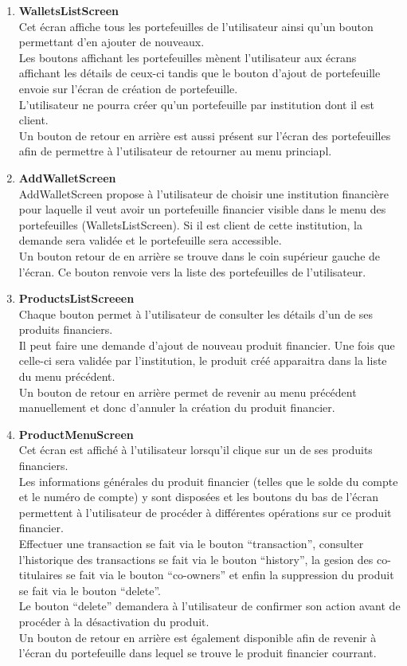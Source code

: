 \documentclass{article}
\begin{document}
\begin{enumerate}
\item \textbf{WalletsListScreen} \\
Cet écran affiche tous les portefeuilles de l'utilisateur ainsi qu'un bouton permettant d'en ajouter de nouveaux.\\
Les boutons affichant les portefeuilles mènent l'utilisateur aux écrans affichant les détails de ceux-ci tandis que le bouton d'ajout de portefeuille envoie sur l'écran de création de portefeuille.\\
L'utilisateur ne pourra créer qu'un portefeuille par institution dont il est client.\\
Un bouton de retour en arrière est aussi présent sur l'écran des portefeuilles afin de permettre à l'utilisateur de retourner au menu princiapl.

\item \textbf{AddWalletScreen} \\
AddWalletScreen propose à l'utilisateur de choisir une institution financière pour laquelle il veut avoir un portefeuille financier visible dans le menu des portefeuilles (WalletsListScreen). Si il est client de cette institution, la demande sera validée et le portefeuille sera accessible.\\
Un bouton retour de en arrière se trouve dans le coin supérieur gauche de l'écran. Ce bouton renvoie vers la liste des portefeuilles de l'utilisateur.

\item \textbf{ProductsListScreeen} \\
Chaque bouton permet à l'utilisateur de consulter les détails d'un de ses produits financiers.\\
Il peut faire une demande d'ajout de nouveau produit financier. Une fois que celle-ci sera validée par l'institution, le produit créé apparaitra dans la liste du menu précédent.\\
Un bouton de retour en arrière permet de revenir au menu précédent manuellement et donc d'annuler la création du produit financier.

\item \textbf{ProductMenuScreen}\\
Cet écran est affiché à l'utilisateur lorsqu'il clique sur un de ses produits financiers. \\
Les informations générales du produit financier (telles que le solde du compte et le numéro de compte) y sont disposées et les boutons du bas de l'écran permettent à l'utilisateur de procéder à différentes opérations sur ce produit financier.\\
Effectuer une transaction se fait via le bouton ``transaction'', consulter l'historique des transactions se fait via le bouton ``history'',
la gesion des co-titulaires se fait via le bouton ``co-owners'' et enfin la suppression du produit se fait via le bouton ``delete''.\\
Le bouton ``delete'' demandera à l'utilisateur de confirmer son action avant de procéder à la désactivation du produit.\\
Un bouton de retour en arrière est également disponible afin de revenir à l'écran du portefeuille dans lequel se trouve le produit financier courrant.


\end{enumerate}
\end{document}
